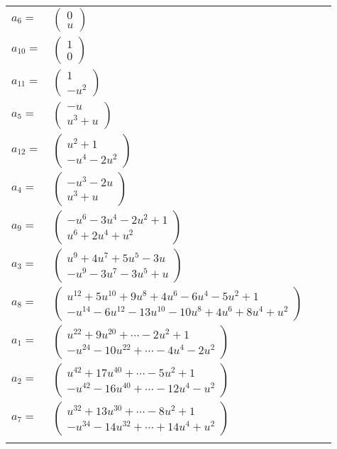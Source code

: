 \documentclass[1p]{elsarticle_modified}
\theoremstyle{definition}
\begin{document}
\begin{tabular}{m{7pt} m{180pt} m{7pt} m{180pt} }
\flushright $a_{6}=$&$\begin{pmatrix}0\\u\end{pmatrix}$ \\
\flushright $a_{10}=$&$\begin{pmatrix}1\\0\end{pmatrix}$ \\
\flushright $a_{11}=$&$\begin{pmatrix}1\\- u^2\end{pmatrix}$ \\
\flushright $a_{5}=$&$\begin{pmatrix}- u\\u^3+u\end{pmatrix}$ \\
\flushright $a_{12}=$&$\begin{pmatrix}u^2+1\\- u^4-2 u^2\end{pmatrix}$ \\
\flushright $a_{4}=$&$\begin{pmatrix}- u^3-2 u\\u^3+u\end{pmatrix}$ \\
\flushright $a_{9}=$&$\begin{pmatrix}- u^6-3 u^4-2 u^2+1\\u^6+2 u^4+u^2\end{pmatrix}$ \\
\flushright $a_{3}=$&$\begin{pmatrix}u^9+4 u^7+5 u^5-3 u\\- u^9-3 u^7-3 u^5+u\end{pmatrix}$ \\
\flushright $a_{8}=$&$\begin{pmatrix}u^{12}+5 u^{10}+9 u^8+4 u^6-6 u^4-5 u^2+1\\- u^{14}-6 u^{12}-13 u^{10}-10 u^8+4 u^6+8 u^4+u^2\end{pmatrix}$ \\
\flushright $a_{1}=$&$\begin{pmatrix}u^{22}+9 u^{20}+\cdots-2 u^2+1\\- u^{24}-10 u^{22}+\cdots-4 u^4-2 u^2\end{pmatrix}$ \\
\flushright $a_{2}=$&$\begin{pmatrix}u^{42}+17 u^{40}+\cdots-5 u^2+1\\- u^{42}-16 u^{40}+\cdots-12 u^4- u^2\end{pmatrix}$ \\
\flushright $a_{7}=$&$\begin{pmatrix}u^{32}+13 u^{30}+\cdots-8 u^2+1\\- u^{34}-14 u^{32}+\cdots+14 u^4+u^2\end{pmatrix}$\\&\end{tabular}
\end{document}
